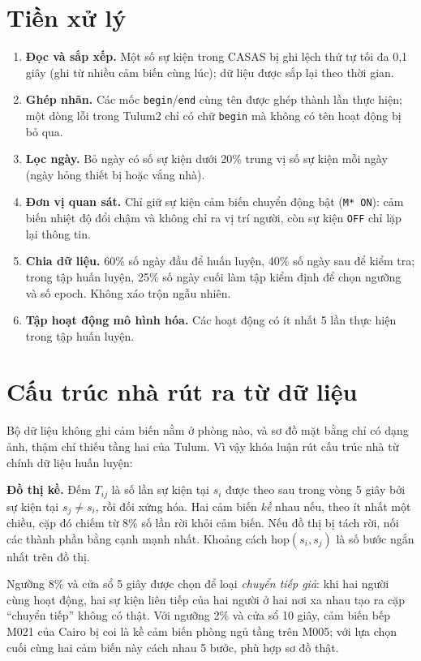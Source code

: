 \section{Tiền xử lý}
\label{sec:m-pre}

\begin{enumerate}
  \item \textbf{Đọc và sắp xếp.} Một số sự kiện trong CASAS bị ghi lệch thứ tự tối đa 0,1 giây (ghi
  từ nhiều cảm biến cùng lúc); dữ liệu được sắp lại theo thời gian.
  \item \textbf{Ghép nhãn.} Các mốc \texttt{begin}/\texttt{end} cùng tên được ghép thành lần thực
  hiện; một dòng lỗi trong Tulum2 chỉ có chữ \texttt{begin} mà không có tên hoạt động bị bỏ qua.
  \item \textbf{Lọc ngày.} Bỏ ngày có số sự kiện dưới 20\% trung vị số sự kiện mỗi ngày (ngày hỏng
  thiết bị hoặc vắng nhà).
  \item \textbf{Đơn vị quan sát.} Chỉ giữ sự kiện cảm biến chuyển động bật (\texttt{M* ON}): cảm biến
  nhiệt độ đổi chậm và không chỉ ra vị trí người, còn sự kiện \texttt{OFF} chỉ lặp lại thông tin.
  \item \textbf{Chia dữ liệu.} 60\% số ngày đầu để huấn luyện, 40\% số ngày sau để kiểm tra; trong
  tập huấn luyện, 25\% số ngày cuối làm tập kiểm định để chọn ngưỡng và số epoch. Không xáo trộn
  ngẫu nhiên.
  \item \textbf{Tập hoạt động mô hình hóa.} Các hoạt động có ít nhất 5 lần thực hiện trong tập huấn luyện.
\end{enumerate}

\section{Cấu trúc nhà rút ra từ dữ liệu}
\label{sec:m-topo}

Bộ dữ liệu không ghi cảm biến nằm ở phòng nào, và sơ đồ mặt bằng chỉ có dạng ảnh, thậm chí thiếu
tầng hai của Tulum. Vì vậy khóa luận rút cấu trúc nhà từ chính dữ liệu huấn luyện:

\textbf{Đồ thị kề.} Đếm $T_{ij}$ là số lần sự kiện tại $s_i$ được theo sau trong vòng 5 giây bởi sự
kiện tại $s_j \neq s_i$, rồi đối xứng hóa. Hai cảm biến \emph{kề} nhau nếu, theo ít nhất một chiều,
cặp đó chiếm từ 8\% số lần rời khỏi cảm biến. Nếu đồ thị bị tách rời, nối các thành phần bằng cạnh
mạnh nhất. Khoảng cách $\mathrm{hop}(s_i, s_j)$ là số bước ngắn nhất trên đồ thị.

Ngưỡng 8\% và cửa sổ 5 giây được chọn để loại \emph{chuyển tiếp giả}: khi hai người cùng hoạt động,
hai sự kiện liên tiếp của hai người ở hai nơi xa nhau tạo ra cặp ``chuyển tiếp'' không có thật. Với
ngưỡng 2\% và cửa sổ 10 giây, cảm biến bếp M021 của Cairo bị coi là kề cảm biến phòng ngủ tầng trên
M005; với lựa chọn cuối cùng hai cảm biến này cách nhau 5 bước, phù hợp sơ đồ thật.

